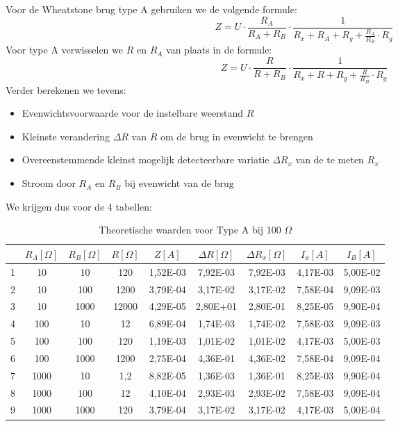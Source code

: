 Voor de Wheatstone brug type A gebruiken we de volgende formule:
\begin{equation}
    Z = U \cdot \frac{R_A}{R_A + R_B} \cdot \frac{1}{R_x + R_A + R_g + \frac{R_A}{R_B}\cdot R_g}
\end{equation}
Voor type A verwisselen we $R$ en $R_A$ van plaats in de formule:
\begin{equation}
    Z = U \cdot \frac{R}{R + R_B} \cdot \frac{1}{R_x + R + R_g + \frac{R}{R_B}\cdot R_g}
\end{equation}
Verder berekenen we tevens:
\begin{itemize}
    \item Evenwichtsvoorwaarde voor de instelbare weerstand $R$
    \item Kleinste verandering $\Delta R$ van $R$ om de brug in evenwicht te brengen
    \item Overeenstemmende kleinst mogelijk detecteerbare variatie $\Delta R_x$ van de te meten $R_x$ 
    \item Stroom door $R_A$ en $R_B$ bij evenwicht van de brug
\end{itemize}
We krijgen dus voor de 4 tabellen:
\begin{table}[H]
    \centering
    \label{tab:TA100}
    \caption{Theoretische waarden voor Type A bij 100 $\Omega$}
    \begin{tabular}{| c | c | c | c | c | c | c | c | c |}
        \hline
                & $R_A [\Omega]$    & $R_B [\Omega]$    & $R [\Omega]$  & $Z [A]$   & $\Delta R [\Omega]$   & $\Delta R_x [\Omega]$ & $I_x [A]$                 & $I_B [A]$             \\ \hline
        1       & 10                & 10                & 120           & 1,52E-03  & 7,92E-03              & 7,92E-03              & 4,17E-03                  & 5,00E-02 \\ \hline
        2       & 10                & 100               & 1200          & 3,79E-04  & 3,17E-02              & 3,17E-02              & 7,58E-04                  & 9,09E-03  \\ \hline   
        3       & 10                & 1000              & 12000         & 4,29E-05  & 2,80E+01              & 2,80E-01              & 8,25E-05                  & 9,90E-04  \\ \hline
        4       & 100               & 10                & 12            & 6,89E-04  & 1,74E-03              & 1,74E-02              & 7,58E-03                  & 9,09E-03  \\ \hline
        5	& 100	   &100	&120	&1,19E-03	&1,01E-02	&1,01E-02	&4,17E-03	&5,00E-03 \\ \hline
        6	&100	&1000	&1200	&2,75E-04	&4,36E-01	&4,36E-02	&7,58E-04	&9,09E-04 \\ \hline
        7	&1000	&10	&1,2	&8,82E-05	&1,36E-03	&1,36E-01	&8,25E-03	&9,90E-04 \\ \hline 
        8	&1000	&100	&12	&4,10E-04	&2,93E-03	&2,93E-02	&7,58E-03	&9,09E-04 \\ \hline
        9	&1000	&1000	&120	&3,79E-04	&3,17E-02	&3,17E-02	&4,17E-03	&5,00E-04 \\ \hline
    \end{tabular}
\end{table}
